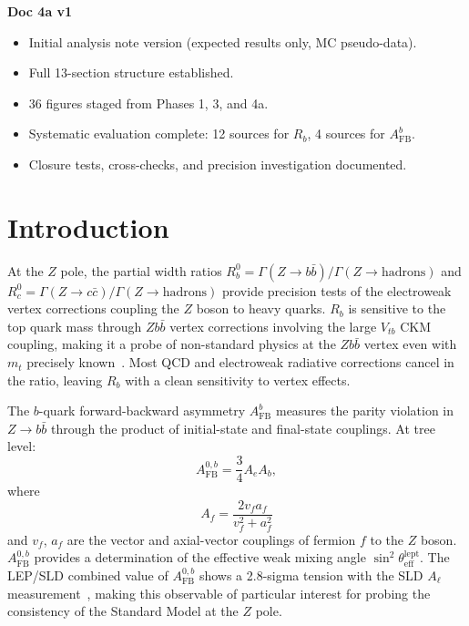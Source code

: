 \documentclass[11pt,a4paper]{article}
\begin{document}
\textbf{Doc 4a v1}
\begin{itemize}
\item Initial analysis note version (expected results only, MC pseudo-data).
\item Full 13-section structure established.
\item 36 figures staged from Phases 1, 3, and 4a.
\item Systematic evaluation complete: 12 sources for $R_b$, 4 sources for $A_\mathrm{FB}^b$.
\item Closure tests, cross-checks, and precision investigation documented.
\end{itemize}

\clearpage

\FloatBarrier
{}
\section{Introduction}
\label{sec:intro}

At the $Z$ pole, the partial width ratios $R_b^0 = \Gamma(Z \to b\bar{b})/\Gamma(Z \to \mathrm{hadrons})$
and $R_c^0 = \Gamma(Z \to c\bar{c})/\Gamma(Z \to \mathrm{hadrons})$ provide precision tests of
the electroweak vertex corrections coupling the $Z$ boson to heavy quarks.
$R_b$ is sensitive to the top quark mass through $Zb\bar{b}$ vertex corrections involving
the large $V_{tb}$ CKM coupling, making it a probe of non-standard physics at the
$Zb\bar{b}$ vertex even with $m_t$ precisely known~\cite{ALEPH:Rb:1996, LEP:EWWG:2005}.
Most QCD and electroweak radiative corrections cancel in the ratio, leaving $R_b$
with a clean sensitivity to vertex effects.

The $b$-quark forward-backward asymmetry $A_\mathrm{FB}^b$ measures the parity violation
in $Z \to b\bar{b}$ through the product of initial-state and final-state couplings.
At tree level:
\begin{equation}
A_\mathrm{FB}^{0,b} = \frac{3}{4} A_e A_b,
\label{eq:afb_tree}
\end{equation}
where
\begin{equation}
A_f = \frac{2 v_f a_f}{v_f^2 + a_f^2}
\label{eq:asymmetry_param}
\end{equation}
and $v_f$, $a_f$ are the vector and axial-vector couplings of fermion $f$ to the $Z$ boson.
$A_\mathrm{FB}^{0,b}$ provides a determination of the effective weak mixing angle
$\sin^2\theta_\mathrm{eff}^\mathrm{lept}$.  The LEP/SLD combined value of $A_\mathrm{FB}^{0,b}$
shows a 2.8-sigma tension with the SLD $A_\ell$ measurement~\cite{LEP:EWWG:2005},
making this observable of particular interest for probing the consistency of the
Standard Model at the $Z$ pole.
\end{document}
